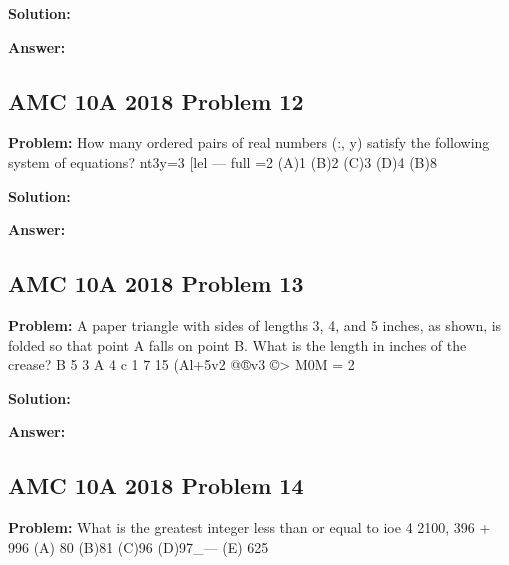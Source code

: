 \documentclass{article}
\newenvironment{problem}{\textbf{Problem: }}{\\}
\newenvironment{solution}{\textbf{Solution: }}{\\}
\newenvironment{answer}{\textbf{Answer: }}{\\}
\begin{document}
\begin{solution}
\end{solution}

\begin{answer}
\end{answer}

\subsection{AMC 10A 2018 Problem 12}

\begin{problem}
How many ordered pairs of real numbers (:, y) satisfy the following system of equations? nt3y=3 [lel — full =2 (A)1 (B)2 (C)3 (D)4 (B)8
\end{problem}

\begin{solution}
\end{solution}

\begin{answer}
\end{answer}

\subsection{AMC 10A 2018 Problem 13}

\begin{problem}
A paper triangle with sides of lengths 3, 4, and 5 inches, as shown, is folded so that point A falls on point B. What is the length in inches of the crease? B 5 3 A 4 c 1 7 15 (Al+5v2 @®v3 ©> M0M = 2
\end{problem}

\begin{solution}
\end{solution}

\begin{answer}
\end{answer}

\subsection{AMC 10A 2018 Problem 14}

\begin{problem}
What is the greatest integer less than or equal to ioe 4 2100, 396 + 996 (A) 80 (B)81 (C)96 (D)97_— (E) 625
\end{problem}
\end{document}
